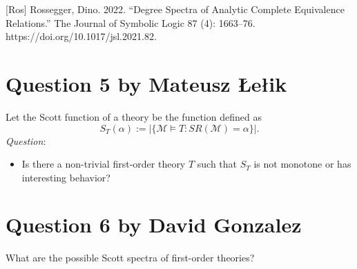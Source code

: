 \documentclass{article}
\begin{document}
 [Ros] Rossegger, Dino. 2022. “Degree Spectra of Analytic Complete Equivalence Relations.” The Journal of Symbolic Logic 87 (4): 1663–76. https://doi.org/10.1017/jsl.2021.82.


\section*{Question 5 {\small{by Mateusz \L{}e\l{}ik}}}
Let the Scott function of a theory  be the function defined as 
 \[S_T(\alpha):=|\{\mathcal{M} \models T : SR(\mathcal{M})= \alpha\}|.\] 
 \textit{Question}:
 \begin{itemize}
     \item Is there a non-trivial first-order theory $T$ such that $S_T$ is not monotone or has interesting behavior?
 \end{itemize}



\section*{Question 6 {\small{by David Gonzalez}}}
What are the possible Scott spectra of first-order theories?
\end{document}
